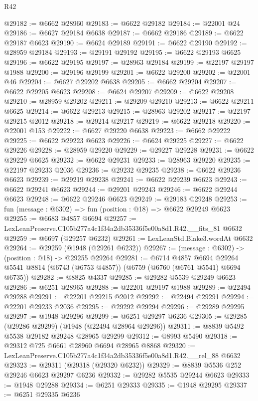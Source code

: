 \begin{lexlean}{R42}
\begin{coremodule}
{@29182 := @6662 @28960
@29183 := @6622 @29182
@29184 := @22001 @24
@29186 := @6627 @29184 @6638
@29187 := @6662 @29186
@29189 := @6622 @29187 @6623
@29190 := @6624 @29189
@29191 := @6622 @29190
@29192 := @28959 @29184
@29193 := @29191 @29192
@29195 := @6622 @29193 @6625
@29196 := @6622 @29195
@29197 := @28963 @29184
@29199 := @22197 @29197 @1988
@29200 := @29196 @29199
@29201 := @6622 @29200
@29202 := @22001 @46
@29204 := @6627 @29202 @6638
@29205 := @6662 @29204
@29207 := @6622 @29205 @6623
@29208 := @6624 @29207
@29209 := @6622 @29208
@29210 := @28959 @29202
@29211 := @29209 @29210
@29213 := @6622 @29211 @6625
@29214 := @6622 @29213
@29215 := @28963 @29202
@29217 := @22197 @29215 @2012
@29218 := @29214 @29217
@29219 := @6622 @29218
@29220 := @22001 @153
@29222 := @6627 @29220 @6638
@29223 := @6662 @29222
@29225 := @6622 @29223 @6623
@29226 := @6624 @29225
@29227 := @6622 @29226
@29228 := @28959 @29220
@29229 := @29227 @29228
@29231 := @6622 @29229 @6625
@29232 := @6622 @29231
@29233 := @28963 @29220
@29235 := @22197 @29233 @2036
@29236 := @29232 @29235
@29238 := @6622 @29236 @6623
@29239 := @29219 @29238
@29241 := @6622 @29239 @6623
@29243 := @6622 @29241 @6623
@29244 := @29201 @29243
@29246 := @6622 @29244 @6623
@29248 := @6622 @29246 @6623
@29249 := @29183 @29248
@29253 := fun (message : @6302) => fun (position : @18) => @6622 @29249 @6623
@29255 := @6683 @4857 @6694
@29257 := LexLeanPreserve.C105b277a4c1f34a2db35336f5e00a8d1.R42.__fits_81 @6632
@29259 := @6697 (@29257 @6232)
@29261 := LexLeanStd.Blake3.wordAt @6632
@29264 := @29259 (@1948 (@29261 @6232))
@29267 := (message : @6302) -> (position : @18) -> @29255 @29264
@29281 := @6714
    @4857
    @6694
    @29264
    @5541
    @8814
    (@6743 (@6753 @4857))
    (@6759 (@6760 (@6761 @5541) @6694 @6735))
@29282 := @8825 @4337
@29285 := @29282 @5539 @29249 @6623
@29286 := @6251 @28965
@29288 := @22201 @29197 @1988
@29289 := @22494 @29288
@29291 := @22201 @29215 @2012
@29292 := @22494 @29291
@29294 := @22201 @29233 @2036
@29295 := @29292 @29294
@29296 := @29289 @29295
@29297 := @1948 @29296
@29299 := @6251 @29297 @6236
@29305 := @29285 (@29286 @29299) (@1948 (@22494 @28964 @29296))
@29311 := @8839 @5492 @5538 @29182 @29248 @28965 @29299
@29312 := @8993 @5490
@29318 := @29312 @725 @6661 @28960 @6694 @28965 @8868
@29320 := LexLeanPreserve.C105b277a4c1f34a2db35336f5e00a8d1.R42.__rel_88 @6632
@29323 := @29311 (@29318 (@29320 @6232))
@29329 := @8839 @5536 @252 @29246 @6623 @29297 @6236
@29332 := @29282 @5535 @29244 @6623
@29333 := @1948 @29288
@29334 := @6251 @29333
@29335 := @1948 @29295
@29337 := @6251 @29335 @6236
}
\end{coremodule}
\end{lexlean}
